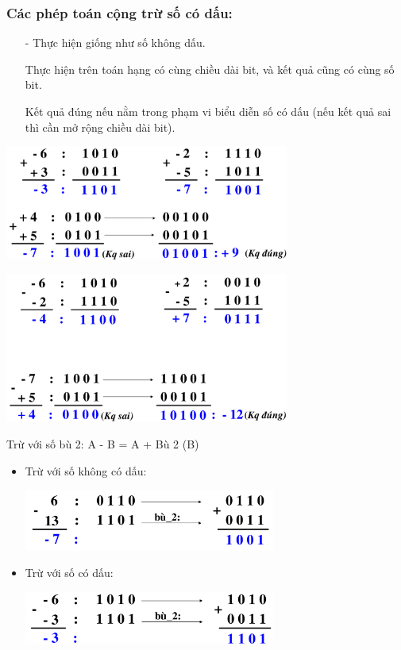 \subsubsection{Các phép toán cộng trừ số có dấu:}
\begin{itemize}
    \item[-] Thực hiện giống như số không dấu.
    \item[] Thực hiện trên toán hạng có cùng chiều dài bit, và kết quả cũng có cùng số bit.
    \item[] Kết quả đúng nếu nằm trong phạm vi biểu diễn số có dấu (nếu kết quả sai thì cần mở rộng chiều dài bit).
\end{itemize}
\begin{center}
    \includegraphics[width = 0.7\textwidth]{./local/image/10.png}
\end{center}
\begin{center}
    \includegraphics[width = 0.7\textwidth]{./local/image/11.png}
\end{center}
Trừ với số bù 2: A - B = A + Bù 2 (B)
\begin{itemize}
    \item Trừ với số không có dấu:
        \begin{center}
            \includegraphics[width = 0.65\textwidth]{./local/image/12.png}
        \end{center}
    \item Trừ với số có dấu:
    \begin{center}
        \includegraphics[width = 0.65\textwidth]{./local/image/13.png}
    \end{center}
\end{itemize}
